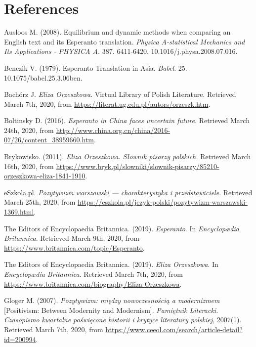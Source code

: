\chapter*{References}


Ausloos M. (2008). Equilibrium and dynamic methods when comparing an English text and its Esperanto translation. \textit{Physica A-statistical Mechanics and Its Applications - PHYSICA A.} 387. 6411-6420. 10.1016/j.physa.2008.07.016. 

Benczik V. (1979). Esperanto Translation in Asia. \textit{Babel}. 25. 10.1075/babel.25.3.06ben. 

Bachórz J. \textit{Eliza Orzeszkowa}. Virtual Library of Polish Literature. Retrieved March 7th, 2020, from \url{https://literat.ug.edu.pl/autors/orzeszk.htm}.

Boltinsky D. (2016). \textit{Esperanto in China faces uncertain future.} Retrieved March 24th, 2020, from \url{http://www.china.org.cn/china/2016-07/26/content_38959660.htm}.

Brykowisko. (2011). \textit{Eliza Orzeszkowa. Słownik pisarzy polskich.} Retrieved March 16th, 2020, from \url{https://www.bryk.pl/slowniki/slownik-pisarzy/85210-orzeszkowa-eliza-1841-1910}.

eSzkola.pl. \textit{Pozytywizm warszawski --- charakterystyka i przedstawiciele}. Retrieved March 25th, 2020, from \url{https://eszkola.pl/jezyk-polski/pozytywizm-warszawski-1369.html}.

The Editors of Encyclopaedia Britannica. (2019). \textit{Esperanto}. In \textit{Encyclopædia Britannica}. Retrieved March 9th, 2020, from \url{https://www.britannica.com/topic/Esperanto}.

The Editors of Encyclopaedia Britannica. (2019). \textit{Eliza Orzeszkowa}. In \textit{Encyclopædia Britannica}. Retrieved March 7th, 2020, from \url{https://www.britannica.com/biography/Eliza-Orzeszkowa}.

Gloger M. (2007). \textit{Pozytywizm: między nowoczesnością a modernizmem} [Positivism: Between Modernity and Modernism]. \textit{Pamiętnik Literacki. Czasopismo kwartalne poświęcone historii i krytyce literatury polskiej}, 2007(1). Retrieved March 7th, 2020, from \url{https://www.ceeol.com/search/article-detail?id=200994}.

